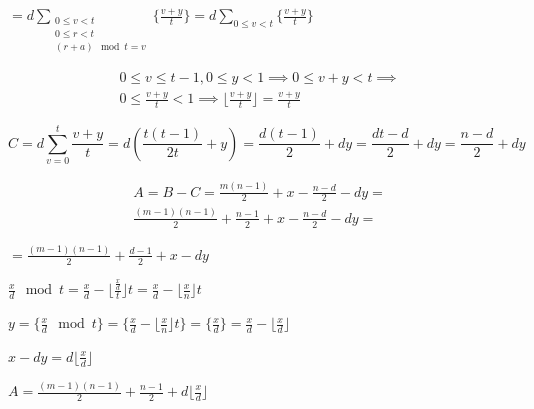 \documentclass{article}
\begin{document}
\( = d\sum_{\substack{0 \leq v < t \\ 0 \leq r < t \\ (r + a) \mod t = v}} \{ \frac{v + y}{t} \} = d\sum_{0 \leq v < t} \{ \frac{v + y}{t} \} \)

\begin{multline*}
0 \leq v \leq t - 1, 0 \leq y < 1 \implies 0 \leq v + y < t \implies \\
0 \leq \frac{v+y}{t} < 1 \implies \lfloor \frac{v + y} {t} \rfloor = \frac{v + y}{t}
\end{multline*}

\[ C = d\sum_{v=0}^{t} \frac{v+y}{t} = d(\frac{t(t-1)}{2t} + y) = \frac{d(t-1)}{2} + dy = \frac{dt-d}{2} + dy = \frac{n-d}{2} + dy \]

\begin{multline*}
A = B - C = \frac{m(n-1)}{2} + x - \frac{n-d}{2} - dy = \\
\frac{(m-1)(n-1)}{2} + \frac{n-1}{2} + x - \frac{n-d}{2} - dy =
\end{multline*}

\( = \frac{(m-1)(n-1)}{2} + \frac{d-1}{2} + x - dy \)

\( \frac{x}{d} \mod t = \frac{x}{d} - \lfloor \frac{\frac{x}{d}}{t} \rfloor t = \frac{x}{d} - \lfloor \frac{x}{n} \rfloor t \)

\( y = \{ \frac{x}{d} \mod t \} = \{ \frac{x}{d} - \lfloor \frac{x}{n} \rfloor t \} = \{ \frac{x}{d} \} = \frac{x}{d} - \lfloor \frac{x}{d} \rfloor \)

\( x - dy = d \lfloor \frac{x}{d} \rfloor \)

\( A = \frac{(m-1)(n-1)}{2} + \frac{n-1}{2} + d \lfloor \frac{x}{d} \rfloor \)
\end{document}
